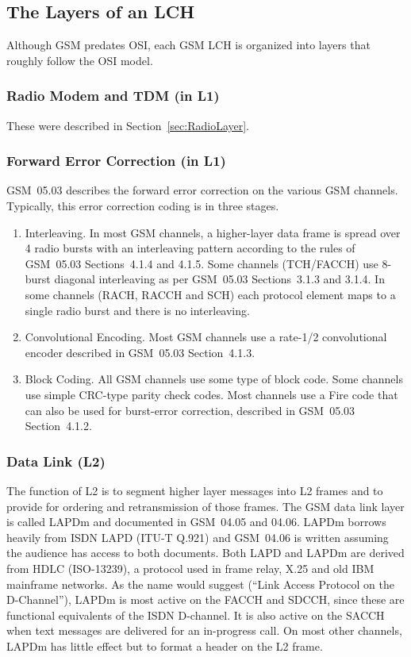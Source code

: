 \documentclass[11pt]{book}
\begin{document}
\subsection{The Layers of an LCH}
Although GSM predates OSI, each GSM LCH is organized into layers that roughly follow the OSI model.

\subsubsection{Radio Modem and TDM (in L1)}
These were described in Section~\ref{sec:RadioLayer}.

\subsubsection{Forward Error Correction (in L1)}
GSM~05.03 describes the forward error correction on the various GSM channels. Typically, this error correction coding is in three stages.
\begin{enumerate}
	\item Interleaving. In most GSM channels, a higher-layer data frame is spread over 4 radio bursts with an interleaving pattern according to the rules of GSM~05.03 Sections~4.1.4 and 4.1.5. Some channels (TCH/FACCH) use 8-burst diagonal interleaving as per GSM~05.03 Sections~3.1.3 and 3.1.4. In some channels (RACH, RACCH and SCH) each protocol element maps to a single radio burst and there is no interleaving.
	\item Convolutional Encoding. Most GSM channels use a rate-1/2 convolutional encoder described in GSM~05.03 Section~4.1.3.
	\item Block Coding. All GSM channels use some type of block code. Some channels use simple CRC-type parity check codes. Most channels use a Fire code that can also be used for burst-error correction, described in GSM~05.03 Section~4.1.2.
\end{enumerate}

\subsubsection{Data Link (L2)}
The function of L2 is to segment higher layer messages into L2 frames and to provide for ordering and retransmission of those frames. The GSM data link layer is called LAPDm and documented in GSM~04.05 and 04.06.  LAPDm borrows heavily from ISDN LAPD (ITU-T Q.921) and GSM~04.06 is written assuming the audience has access to both documents.  Both LAPD and LAPDm are derived from HDLC (ISO-13239), a protocol used in frame relay, X.25 and old IBM mainframe networks.  As the name would suggest (``Link Access Protocol on the D-Channel''), LAPDm is most active on the FACCH and SDCCH, since these are functional equivalents of the ISDN D-channel.  It is also active on the SACCH when text messages are delivered for an in-progress call.  On most other channels, LAPDm has little effect but to format a header on the L2 frame.
\end{document}
